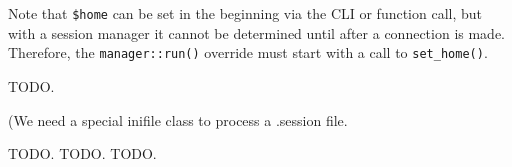    Note that \texttt{\$home} can be set in the beginning via the CLI or
   function call, but with a session manager it cannot be determined until
   after a connection is made.
   Therefore, the \texttt{manager::run()} override must start with a call to
   \texttt{set\_home()}.

   TODO.

   (We need a special inifile class to process a .session file.

   TODO.
   TODO.
   TODO.

